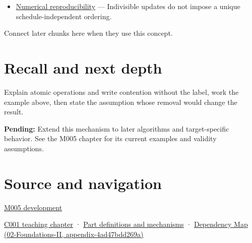 \begin{itemize}
\tightlist
\item
  \hyperref[appendix-5f1a2c3f97ff]{Numerical reproducibility} --- Indivisible updates do not impose a unique schedule-independent ordering.
\end{itemize}

Connect later chunks here when they use this concept.

\section{Recall and next depth}\label{appendix-e12d1b03fefb-recall-and-next-depth}

Explain atomic operations and write contention without the label, work the example above, then state the assumption whose removal would change the result.

\textbf{Pending:} Extend this mechanism to later algorithms and target-specific behavior. See the M005 chapter for its current examples and validity assumptions.

\section{Source and navigation}\label{appendix-e12d1b03fefb-source-and-navigation}

\href{Continuous\%20Notes/Computing\%20Foundations\%20-\%20From\%20Bits\%20to\%20C++\%20and\%20Systems\%20APIs\#When\%20arithmetic\%20meets\%20uncertainty}{M005 development}

\href{Continuous\%20Notes/Computing\%20Foundations\%20-\%20From\%20Bits\%20to\%20C++\%20and\%20Systems\%20APIs\#From\%20a\%20signal\%20to\%20an\%20interpretation}{C001 teaching chapter} · \hyperref[appendix-fd090d982a15]{Part definitions and mechanisms} · \href{../02-Foundations-II/main.pdf\#nameddest=appendix-4ad47bdd269a}{Dependency Map (02-Foundations-II, appendix-4ad47bdd269a)}
